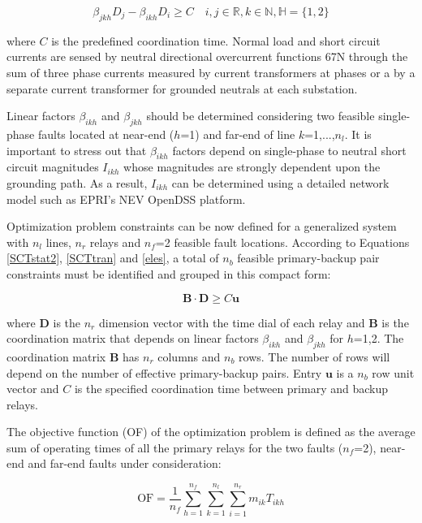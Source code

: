 \documentclass[letterpaper, 10 pt, conference]{IEEEtran}
\begin{document}
 \begin{equation} \label{SCTstat2}
  \beta_{jkh}D_{j}-\beta_{ikh}D_{i}\geq C\quad  i,j\in \mathds{R}, k\in \mathds{N}, \mathds{H}=\{1,2\}
\end{equation}

where $C$ is the predefined coordination time. Normal load and short circuit currents are sensed by neutral directional overcurrent functions 67N through the sum of three phase currents measured by current transformers at phases or a by  a separate current transformer for grounded neutrals at each substation.

Linear factors $\beta_{ikh}$ and  $\beta_{jkh}$   should be determined considering two feasible single-phase faults located at near-end ($h$=1) and far-end of line $k$=1,...,$n_l$. It is important to stress out that  $\beta_{ikh}$  factors depend on single-phase to neutral short circuit magnitudes $I_{ikh}$  whose magnitudes are strongly dependent upon the grounding path. As a result, $I_{ikh}$ can be determined using a detailed network model such as EPRI's NEV OpenDSS platform.

Optimization problem constraints can be now defined for a generalized system with $n_l$ lines, $n_r$ relays and $n_f$=2 feasible fault locations. According to Equations \ref{SCTstat2}, \ref{SCTtran} and \ref{eles}, a total of $n_b$ feasible primary-backup pair constraints must be identified and grouped in this compact form:

\begin{equation}\label{BB}
 \mathbf{B}\cdot\mathbf{D}\ge C\mathbf{u}
\end{equation}

where  $\mathbf{D}$ is the $n_r$ dimension vector with the time dial of each relay and $\mathbf{B}$ is the   coordination matrix that depends on linear factors $\beta_{ikh}$  and $\beta_{jkh}$ for $h$=1,2. The coordination matrix $\mathbf{B}$ has $n_r$ columns and $n_b$ rows. The number of rows will depend on the number of effective primary-backup pairs. Entry  $\mathbf{u}$ is a $n_b$ row unit vector and $C$ is the specified coordination time between primary and backup relays.

The objective function (OF) of the optimization problem is defined as the average sum of operating times of all the
primary relays for the two faults ($n_f$=2), near-end and far-end faults under consideration:

\begin{equation}\label{objective}
  \mbox{OF}=\frac{1}{n_f}\sum_{h=1}^{n_f}\sum_{k=1}^{n_l}\sum_{i=1}^{n_r}m_{ik}  T_{ikh}
\end{equation}
\end{document}
